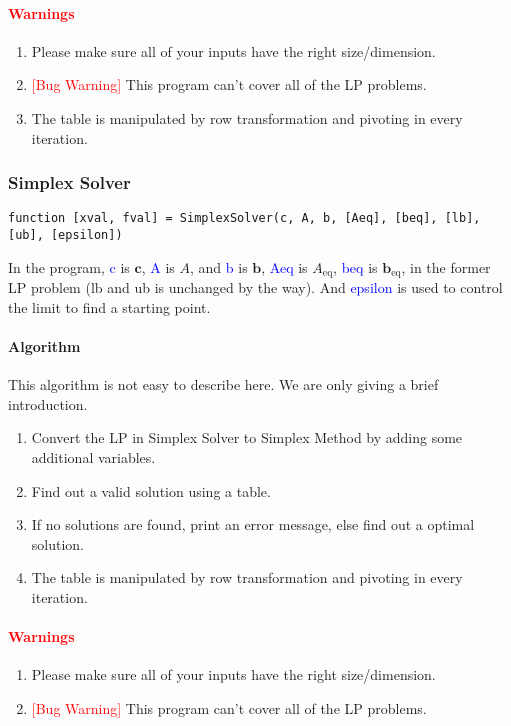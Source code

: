 \documentclass{article}
\begin{document}
\paragraph{\textcolor{red}{Warnings}}
\begin{enumerate}
    \item Please make sure all of your inputs have the right size/dimension.
    \item \textcolor{red}{[Bug Warning]} This program can't cover all of the LP problems.
    \item The table is manipulated by row transformation and pivoting in every iteration.
\end{enumerate}

\subsubsection{Simplex Solver}
\begin{verbatim}
function [xval, fval] = SimplexSolver(c, A, b, [Aeq], [beq], [lb], [ub], [epsilon])    
\end{verbatim}
In the program, \textcolor{blue}{c} is $\mathbf{c}$, \textcolor{blue}{A} is $A$, and \textcolor{blue}{b} is $\mathbf{b}$, \textcolor{blue}{Aeq} is $A_{\mbox{eq}}$, \textcolor{blue}{beq} is $\mathbf{b}_{\mbox{eq}}$, in the former LP problem (lb and ub is unchanged by the way). And \textcolor{blue}{epsilon} is used to control the limit to find a starting point.

\paragraph{Algorithm}
This algorithm is not easy to describe here. We are only giving a brief introduction.
\begin{enumerate}
    \item Convert the LP in Simplex Solver to Simplex Method by adding some additional variables. 
    \item Find out a valid solution using a table.
    \item If no solutions are found, print an error message, else find out a optimal solution.
    \item The table is manipulated by row transformation and pivoting in every iteration.    
\end{enumerate}

\paragraph{\textcolor{red}{Warnings}}
\begin{enumerate}
    \item Please make sure all of your inputs have the right size/dimension.
    \item \textcolor{red}{[Bug Warning]} This program can't cover all of the LP problems.
\end{enumerate}
\end{document}
